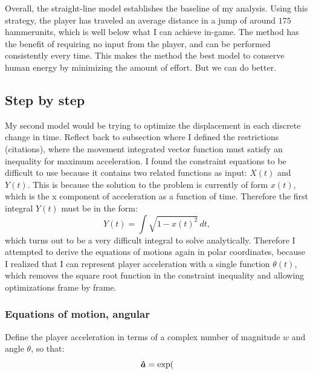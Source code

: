 Overall, the straight-line model establishes the baseline of my analysis. Using this strategy, the player has traveled an average distance in a jump of around $175$ hammerunits, which is well below what I can achieve in-game. The method has the benefit of requiring no input from the player, and can be performed consistently every  time. This makes the method the best model to conserve human energy by minimizing the amount of effort. But we can do better.





\subsection{Step by step}
My second model would be trying to optimize the displacement in each discrete change in time. Reflect back to subsection where I defined the restrictions (citations), where the movement integrated vector function must satisfy an inequality for maximum acceleration. I found the constraint equations to be difficult to use because it contains two related functions as input: $X(t)$ and $Y(t)$. This is because the solution to the problem is currently of form $x(t)$, which is the x component of acceleration as a function of time. Therefore the first integral $Y(t)$ must be in the form:
\[
    Y(t) = \int \sqrt{1-x(t)^2} \, dt,
\]
which turns out to be a very difficult integral to solve analytically. Therefore I attempted to derive the equations of motions again in polar coordinates, because I realized that I can represent player acceleration with a single function $\theta(t)$, which removes the square root function in the constraint inequality and allowing optimizations frame by frame.

\subsubsection{Equations of motion, angular}
Define the player acceleration in terms of a complex number of magnitude $w$ and angle $\theta$, so that:
\[
    \boldsymbol{\hat{a}} = \exp(
\]




